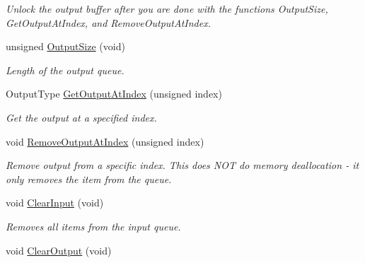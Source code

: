 \begin{DoxyCompactItemize}
\begin{DoxyCompactList}\small\item\em Unlock the output buffer after you are done with the functions Output\-Size, Get\-Output\-At\-Index, and Remove\-Output\-At\-Index. \end{DoxyCompactList}\item 
\hypertarget{struct_thread_pool_ac2ebae170e7dbdbad6034ba69271f86f}{unsigned \hyperlink{struct_thread_pool_ac2ebae170e7dbdbad6034ba69271f86f}{Output\-Size} (void)}\label{struct_thread_pool_ac2ebae170e7dbdbad6034ba69271f86f}

\begin{DoxyCompactList}\small\item\em Length of the output queue. \end{DoxyCompactList}\item 
\hypertarget{struct_thread_pool_ade45848613e8230e5324edabe40fcde9}{Output\-Type \hyperlink{struct_thread_pool_ade45848613e8230e5324edabe40fcde9}{Get\-Output\-At\-Index} (unsigned index)}\label{struct_thread_pool_ade45848613e8230e5324edabe40fcde9}

\begin{DoxyCompactList}\small\item\em Get the output at a specified index. \end{DoxyCompactList}\item 
\hypertarget{struct_thread_pool_afb4958a8df475d6060bede0fa4af7faa}{void \hyperlink{struct_thread_pool_afb4958a8df475d6060bede0fa4af7faa}{Remove\-Output\-At\-Index} (unsigned index)}\label{struct_thread_pool_afb4958a8df475d6060bede0fa4af7faa}

\begin{DoxyCompactList}\small\item\em Remove output from a specific index. This does N\-O\-T do memory deallocation -\/ it only removes the item from the queue. \end{DoxyCompactList}\item 
\hypertarget{struct_thread_pool_a568d636d8a27645c6641d3b4cc7308f6}{void \hyperlink{struct_thread_pool_a568d636d8a27645c6641d3b4cc7308f6}{Clear\-Input} (void)}\label{struct_thread_pool_a568d636d8a27645c6641d3b4cc7308f6}

\begin{DoxyCompactList}\small\item\em Removes all items from the input queue. \end{DoxyCompactList}\item 
\hypertarget{struct_thread_pool_a8d8d2d173ca5ddb99614ed5b9df1fb85}{void \hyperlink{struct_thread_pool_a8d8d2d173ca5ddb99614ed5b9df1fb85}{Clear\-Output} (void)}\label{struct_thread_pool_a8d8d2d173ca5ddb99614ed5b9df1fb85}


\end{DoxyCompactItemize}
